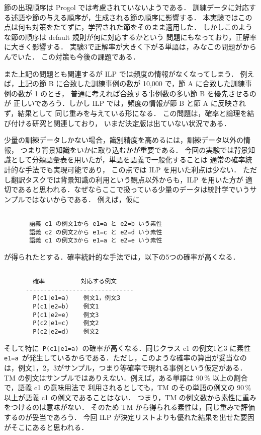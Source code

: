 節の出現順序は Progol では考慮されていないようである．
訓練データに対応する述語や節の与える順序が，生成される節の順序に影響する．
本実験ではこの点は何も対策をたてずに，学習された節をそのまま適用した．
しかしこのような節の順序は default 規則が何に対応するかという
問題にもなっており，正解率に大きく影響する．
実験3で正解率が大きく下がる単語は，みなこの問題がからんでいた．
この対策も今後の課題である．

また上記の問題とも関連するが ILP では頻度の情報がなくなってしまう．
例えば，上記の節 B に合致した訓練事例の数が 10,000 で，節 A に合致した訓練事例の数が 1 のとき，
普通に考えれば合致する事例数の多い節 B を優先させるのが
正しいであろう．しかし ILP では，頻度の情報が節 B と節 A に反映されず，結果として
同じ重みを与えている形になる．
この問題は，確率と論理を結び付ける研究と関連しており，
いまだ決定版は出ていない状況である\cite{furukawa}．

少量の訓練データしかない場合，識別精度を高めるには，訓練データ以外の情報，
つまり背景知識をいかに取り込むかが重要である．
今回の実験では背景知識として分類語彙表を用いたが，単語を語義で一般化することは
通常の確率統計的な手法でも実現可能であり\cite{almuallim}，
この点では ILP を用いた利点は少ない．
ただし翻訳タスクでは背景知識の利用という観点以外からも，ILP を用いた方が
適切であると思われる．なぜならここで扱っている少量のデータは統計学でいうサンプルではないからである．
例えば，仮に

\begin{verbatim}

       語義 c1 の例文1から e1=a と e2=b いう素性
       語義 c2 の例文2から e1=c と e2=d いう素性
       語義 c1 の例文3から e1=a と e2=e いう素性

\end{verbatim}
\noindent
が得られたとする．確率統計的な手法では，以下の5つの確率が高くなる．

\begin{verbatim}

        確率          対応する例文
      ------------------------------
        P(c1|e1=a)    例文1，例文3
        P(c1|e2=b)    例文1
        P(c1|e2=e)    例文3
        P(c2|e1=c)    例文2
        P(c2|e2=d)    例文2

\end{verbatim}

\noindent
そして特に\verb# P(c1|e1=a) #の確率が高くなる．同じクラス c1 の例文1と3
に素性\verb| e1=a |が発生しているからである．ただし，このような確率の算出が妥当なの
は，例文1，2，3がサンプル，つまり等確率で現れる事例という仮定がある．
TM の例文はサンプルではありえない．例えば，ある単語は 90\,\% 以上の割合で，語義 c1 の意味用法で
利用されるとしても，TM のその単語の例文の 90\,\% 以上が語義 c1 の例文であることはない．
つまり，TM の例文数から素性に重みをつけるのは意味がない．
そのため TM から得られる素性は，同じ重みで評価するのが妥当であろう．
今回 ILP が決定リストよりも優れた結果を出せた要因がそこにあると思われる．

